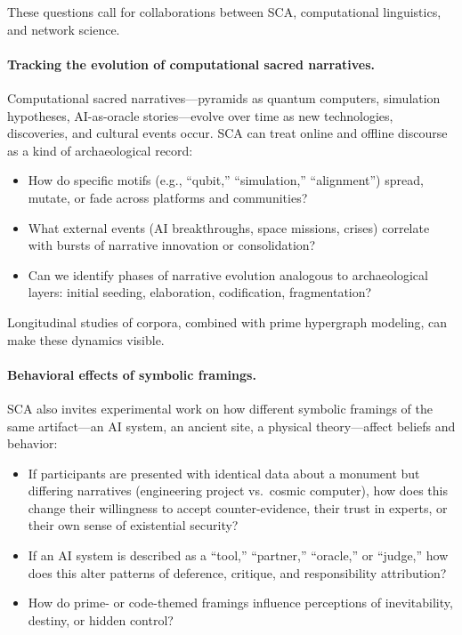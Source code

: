\documentclass[12]{amsart}
\theoremstyle{plain}
\begin{document}
These questions call for collaborations between SCA, computational linguistics, and network science.

\paragraph{Tracking the evolution of computational sacred narratives.}

Computational sacred narratives—pyramids as quantum computers, simulation hypotheses, AI-as-oracle stories—evolve over time as new technologies, discoveries, and cultural events occur. SCA can treat online and offline discourse as a kind of archaeological record:

\begin{itemize}
  \item How do specific motifs (e.g., ``qubit,'' ``simulation,'' ``alignment'') spread, mutate, or fade across platforms and communities?
  \item What external events (AI breakthroughs, space missions, crises) correlate with bursts of narrative innovation or consolidation?
  \item Can we identify phases of narrative evolution analogous to archaeological layers: initial seeding, elaboration, codification, fragmentation?
\end{itemize}

Longitudinal studies of corpora, combined with prime hypergraph modeling, can make these dynamics visible.

\paragraph{Behavioral effects of symbolic framings.}

SCA also invites experimental work on how different symbolic framings of the same artifact—an AI system, an ancient site, a physical theory—affect beliefs and behavior:

\begin{itemize}
  \item If participants are presented with identical data about a monument but differing narratives (engineering project vs.\ cosmic computer), how does this change their willingness to accept counter-evidence, their trust in experts, or their own sense of existential security?
  \item If an AI system is described as a ``tool,'' ``partner,'' ``oracle,'' or ``judge,'' how does this alter patterns of deference, critique, and responsibility attribution?
  \item How do prime- or code-themed framings influence perceptions of inevitability, destiny, or hidden control?
\end{itemize}
\end{document}
